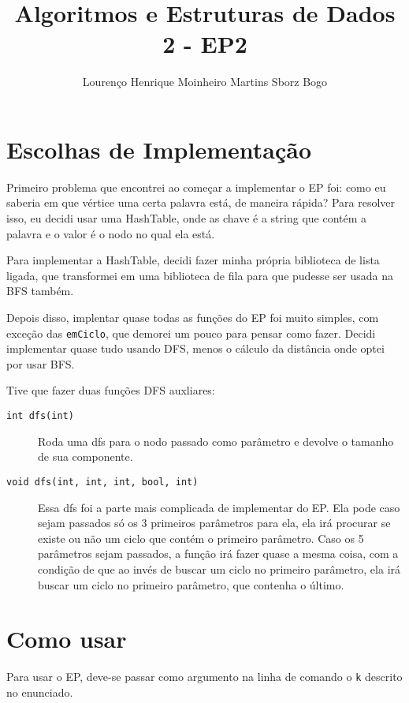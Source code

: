 \documentclass[12pt]{article}
\title{Algoritmos e Estruturas de Dados 2 - EP2}
\author{Lourenço Henrique Moinheiro Martins Sborz Bogo}
\date{}
\begin{document}
\maketitle

\section{Escolhas de Implementação}

Primeiro problema que encontrei ao começar a implementar o EP foi: como eu saberia em que vértice uma certa palavra está, de maneira rápida? Para resolver isso, eu decidi usar uma HashTable, onde as chave é a string que contém a palavra e o valor é o nodo no qual ela está.

Para implementar a HashTable, decidi fazer minha própria biblioteca de lista ligada, que transformei em uma biblioteca de fila para que pudesse ser usada na BFS também.

Depois disso, implentar quase todas as funções do EP foi muito simples, com exceção das \texttt{emCiclo}, que demorei um pouco para pensar como fazer. Decidi implementar quase tudo usando DFS, menos o cálculo da distância onde optei por usar BFS.

Tive que fazer duas funções DFS auxliares:

\begin{description}
\item[\texttt{int dfs(int)}] Roda uma dfs para o nodo passado como parâmetro e devolve o tamanho de sua componente.
  
\item[\texttt{void dfs(int, int, int, bool, int)}] Essa dfs foi a parte mais complicada de implementar do EP. Ela pode caso sejam passados só os 3 primeiros parâmetros para ela, ela irá procurar se existe ou não um ciclo que contém o primeiro parâmetro. Caso os 5 parâmetros sejam passados, a função irá fazer quase a mesma coisa, com a condição de que ao invés de buscar um ciclo no primeiro parâmetro, ela irá buscar um ciclo no primeiro parâmetro, que contenha o último.
  
\end{description}

\newpage

\section{Como usar}

Para usar o EP, deve-se passar como argumento na linha de comando o \texttt{k} descrito no enunciado.
\end{document}
